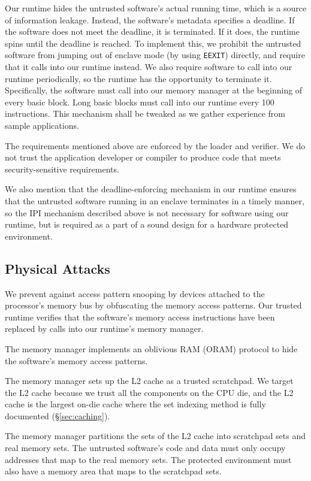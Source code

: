 Our runtime hides the untrusted software's actual running time, which is a
source of information leakage. Instead, the software's metadata specifies a
deadline. If the software does not meet the deadline, it is terminated. If it
does, the runtime spins until the deadline is reached. To implement this, we
prohibit the untrusted software from jumping out of enclave mode (by using
\texttt{EEXIT}) directly, and require that it calls into our runtime instead.
We also require software to call into our runtime periodically, so the runtime
has the opportunity to terminate it. Specifically, the software must call into
our memory manager at the beginning of every basic block. Long basic blocks
must call into our runtime every 100 instructions. This mechanism shall be
tweaked as we gather experience from sample applications.

The requirements mentioned above are enforced by the loader and verifier. We do
not trust the application developer or compiler to produce code that meets
security-sensitive requirements.

We also mention that the deadline-enforcing mechanism in our runtime ensures
that the untrusted software running in an enclave terminates in a timely
manner, so the IPI mechanism described above is not necessary for software
using our runtime, but is required as a part of a sound design for a hardware
protected environment.


\subsection{Physical Attacks}

We prevent against access pattern snooping by devices attached to the
processor's memory bus by obfuscating the memory access patterns. Our trusted
runtime verifies that the software's memory access instructions have been
replaced by calls into our runtime's memory manager.

The memory manager
implements an oblivious RAM (ORAM) protocol \cite{stefanov2013path} to hide the
software's memory access patterns.

The memory manager sets up the L2 cache as a trusted scratchpad. We target the
L2 cache because we trust all the components on the CPU die, and the L2 cache
is the largest on-die cache where the set indexing method is fully documented
(\S \ref{sec:caching}).

The memory manager partitions the sets of the L2 cache into scratchpad sets and
real memory sets. The untrusted software's code and data must only occupy
addresses that map to the real memory sets. The protected environment must also
have a memory area that maps to the scratchpad sets.

